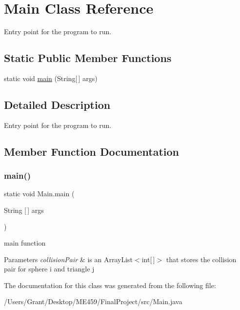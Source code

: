 \hypertarget{class_main}{}\section{Main Class Reference}
\label{class_main}


Entry point for the program to run.  


\subsection*{Static Public Member Functions}
\begin{DoxyCompactItemize}
\item 
static void \mbox{\hyperlink{class_main_a8a5d0f827edddff706cc0e6740d0579a}{main}} (String\mbox{[}$\,$\mbox{]} args)
\end{DoxyCompactItemize}


\subsection{Detailed Description}
Entry point for the program to run. 

\subsection{Member Function Documentation}
\mbox{\label{class_main_a8a5d0f827edddff706cc0e6740d0579a}} 
\subsubsection{\texorpdfstring{main()}{main()}}
{\footnotesize\ttfamily static void Main.\+main (\begin{DoxyParamCaption}\item[{String \mbox{[}$\,$\mbox{]}}]{args }\end{DoxyParamCaption})\hspace{0.3cm}{\ttfamily [static]}}

main function 
\begin{DoxyParams}{Parameters}
{\em collision\+Pair} & is an Array\+List$<$int\mbox{[}$\,$\mbox{]}$>$ that stores the collision pair for sphere i and triangle j\\
\hline
\end{DoxyParams}


The documentation for this class was generated from the following file\+:\begin{DoxyCompactItemize}
\item 
/\+Users/\+Grant/\+Desktop/\+M\+E459/\+Final\+Project/src/Main.\+java\end{DoxyCompactItemize}
